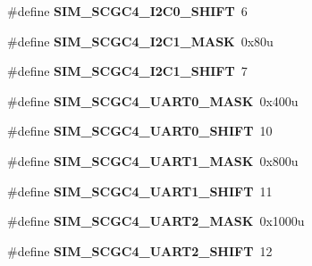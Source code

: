 \begin{DoxyCompactItemize}
\#define {\bfseries S\+I\+M\+\_\+\+S\+C\+G\+C4\+\_\+\+I2\+C0\+\_\+\+S\+H\+I\+FT}~6
\item 
\mbox{\label{group___s_i_m___register___masks_gad28d1d702a535531373c915824c34793}} 
\#define {\bfseries S\+I\+M\+\_\+\+S\+C\+G\+C4\+\_\+\+I2\+C1\+\_\+\+M\+A\+SK}~0x80u
\item 
\mbox{\label{group___s_i_m___register___masks_ga9f7b3fb0b1b7843cdf821b6b9a86ecfb}} 
\#define {\bfseries S\+I\+M\+\_\+\+S\+C\+G\+C4\+\_\+\+I2\+C1\+\_\+\+S\+H\+I\+FT}~7
\item 
\mbox{\label{group___s_i_m___register___masks_ga8fc8faeefc38393c83454ceba120d5df}} 
\#define {\bfseries S\+I\+M\+\_\+\+S\+C\+G\+C4\+\_\+\+U\+A\+R\+T0\+\_\+\+M\+A\+SK}~0x400u
\item 
\mbox{\label{group___s_i_m___register___masks_gae3407d4e1676ac6654898712335842b0}} 
\#define {\bfseries S\+I\+M\+\_\+\+S\+C\+G\+C4\+\_\+\+U\+A\+R\+T0\+\_\+\+S\+H\+I\+FT}~10
\item 
\mbox{\label{group___s_i_m___register___masks_ga24a3ebc9f4c6154041b1a39b33f3c121}} 
\#define {\bfseries S\+I\+M\+\_\+\+S\+C\+G\+C4\+\_\+\+U\+A\+R\+T1\+\_\+\+M\+A\+SK}~0x800u
\item 
\mbox{\label{group___s_i_m___register___masks_ga2eda3e80bcf9a5ee77ce321d86cd92d0}} 
\#define {\bfseries S\+I\+M\+\_\+\+S\+C\+G\+C4\+\_\+\+U\+A\+R\+T1\+\_\+\+S\+H\+I\+FT}~11
\item 
\mbox{\label{group___s_i_m___register___masks_gaea7b7b8d6abc055026d4ca7299206597}} 
\#define {\bfseries S\+I\+M\+\_\+\+S\+C\+G\+C4\+\_\+\+U\+A\+R\+T2\+\_\+\+M\+A\+SK}~0x1000u
\item 
\mbox{\label{group___s_i_m___register___masks_gae844b2ce3371466add7387b9ea32bc4c}} 
\#define {\bfseries S\+I\+M\+\_\+\+S\+C\+G\+C4\+\_\+\+U\+A\+R\+T2\+\_\+\+S\+H\+I\+FT}~12
\item 
\mbox{\label{group___s_i_m___register___masks_ga136bfa98e3aafded899c9806d5410d4d}} 

\end{DoxyCompactItemize}
